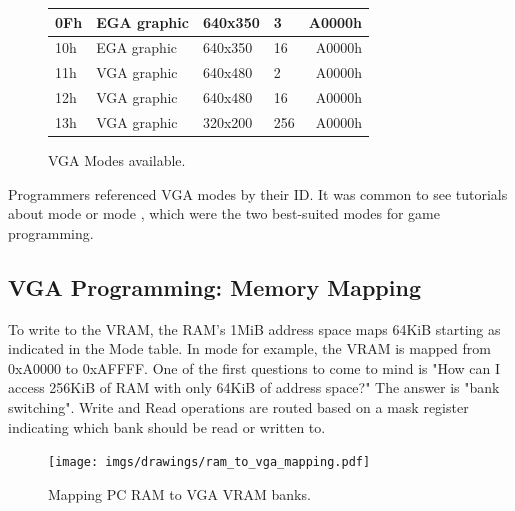 \documentclass[book.tex]{subfiles}
\begin{document}
\begin{figure}[H]
\begin{table}[H]
\begin{tabularx}{\textwidth}[c]{llllr}
0Fh           & EGA graphic   & 640x350         & 3               & A0000h                                \\ \hline
10h           & EGA graphic   & 640x350         & 16              & A0000h                                \\ \hline
11h           & VGA graphic   & 640x480         & 2               & A0000h                                \\ \hline
12h           & VGA graphic   & 640x480         & 16              & A0000h                                \\ \hline
13h           & VGA graphic   & 320x200         & 256             & A0000h                                \\ \hline
\end{tabularx}
\end{table}
\caption{VGA Modes available.}\label{fig:vga_modes}
\label{vga-modes-available}
 \end{figure}
 
 Programmers referenced VGA modes by their ID. It was common to see tutorials about mode  or mode , which were the two best-suited modes for game programming.


 \subsection{VGA Programming: Memory Mapping}
To write to the VRAM, the RAM's 1MiB address space maps 64KiB starting as indicated in the Mode table. In mode  for example, the VRAM is mapped from 0xA0000 to 0xAFFFF. One of the first questions to come to mind is "How can I access 256KiB of RAM with only 64KiB of address space?" The answer is "bank switching". Write and Read operations are routed based on a mask register indicating which bank should be read or written to.\\
\par
 \begin{figure}[H]
\centering
  
      \texttt{[image: imgs/drawings/ram\_to\_vga\_mapping.pdf]}
    
\caption{Mapping PC RAM to VGA VRAM banks.}
\end{figure}



 
\end{document}
